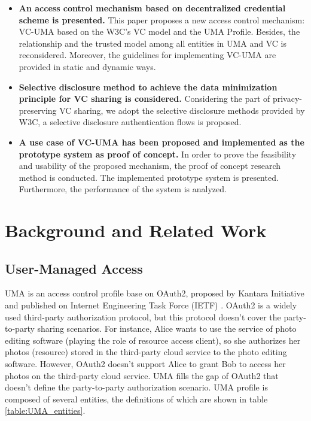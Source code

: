 \documentclass[conference, dvipdfmx]{IEEEtran} %
\begin{document}
\begin{sloppypar}
\begin{itemize}
  \item \textbf{An access control mechanism based on decentralized credential scheme is presented.}	This paper proposes a new access control mechanism: VC-UMA based on the W3C's VC model\cite{VC_model} and the UMA Profile\cite{UMA}. Besides, the relationship and the trusted model among all entities in UMA and VC is reconsidered. Moreover, the guidelines for implementing VC-UMA are provided in static and dynamic ways.
  \item \textbf{Selective disclosure method to achieve the data minimization principle for VC sharing is considered.} Considering the part of privacy-preserving VC sharing, we adopt the selective disclosure methods provided by W3C, a selective disclosure authentication flows is proposed.
  \item \textbf{A use case of VC-UMA has been proposed and implemented as the prototype system as proof of concept.}
  In order to prove the feasibility and usability of the proposed mechanism, the proof of concept research method is conducted. The implemented prototype system is presented. Furthermore, the performance of the system is analyzed.
\end{itemize}


\section{Background and Related Work}
\label{sec:back}
\subsection{User-Managed Access}


UMA is an access control profile base on OAuth2\cite{OAuth2}, proposed by Kantara Initiative and published on Internet Engineering Task Force (IETF) \cite{UMA}. 
OAuth2 is a  widely used third-party authorization protocol, but this protocol doesn't cover the party-to-party sharing scenarios.
For instance, Alice wants to use the service of photo editing software (playing the role of resource access client), so she authorizes her photos (resource) stored in the third-party cloud service to the photo editing software. However, OAuth2 doesn't support Alice to grant Bob to access her photos on the third-party cloud service.
UMA fills the gap of OAuth2 that doesn't define the party-to-party authorization scenario. 
UMA profile is composed of several entities, the definitions of which are shown in table \ref{table:UMA_entities}.


\end{sloppypar}
\end{document}
